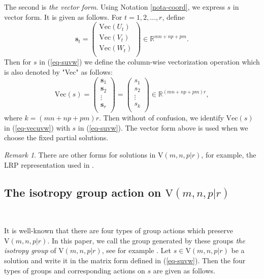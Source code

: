 \documentclass[reqno]{amsart}
\theoremstyle{definition}
\numberwithin{equation}{section}
\theoremstyle{remark}
\newtheorem{remark}[theorem]{Remark}
\begin{document}
The second is \emph{the vector form}.  Using Notation \ref{nota-coord}, we express $s$ in vector form. It is given as follows. For $t=1,2,\ldots,r$, define
\begin{equation*}
\mathbf{s}_t=\left(
   \begin{array}{c}
         \mathrm{Vec}(U_t) \\
         \mathrm{Vec}(V_t) \\
         \mathrm{Vec}(W_t) \\
          \end{array}  \right)\in \mathbb{R}^{mn+np+pm}.
\end{equation*}
Then for $s$ in (\ref{eq-suvw}) we define the column-wise vectorization operation which is also denoted by "\textrm{Vec}"  as follows:
\begin{equation}\label{eq-vecuvw}
\mathrm{Vec}(s)
=\left(
    \begin{array}{c}
      \mathbf{s}_1 \\
      \mathbf{s}_2 \\
      \vdots\\
      \mathbf{s}_r\\
    \end{array}
  \right)
=\left(
    \begin{array}{c}
      s_1 \\
      s_2 \\
      \vdots\\
      s_k\\
    \end{array}
  \right)\in \mathbb{R}^{(mn+np+pm)r},
  \end{equation}
where $k=(mn+np+pm)r$. Then without of confusion, we identify 
$\mathrm{Vec}(s)$ in (\ref{eq-vecuvw}) with  $s$ in (\ref{eq-suvw}). 
The vector form above is used when we choose the fixed partial solutions.

\begin{remark}
There are other forms for solutions in $\mathrm{V}(m,n,p|r)$, for example, the LRP representation used in \cite{dumas25,dumas26}.
\end{remark}


\subsection{The isotropy group action on $\mathrm{V}(m,n,p|r)$}\label{subsec-isogroup}
\

It is well-known that there are four types of group actions which preserve $\mathrm{V}(m,n,p|r)$. In this paper, we call the group generated by these groups \emph{the isotropy group} of $\mathrm{V}(m,n,p|r)$, see for example \cite{Bur15,deGr78-1,Heule21}. Let $s\in\mathrm{V}(m,n,p|r)$ be a solution and write it in the matrix form defined in (\ref{eq-suvw}). Then the four types of groups and corresponding actions on $s$ are given as follows.
\end{document}
